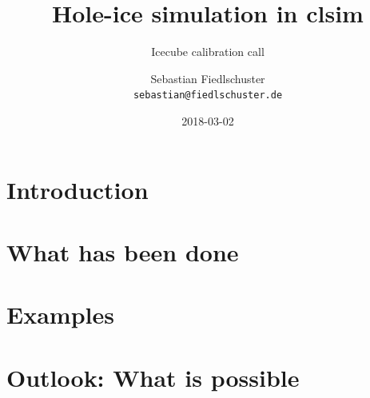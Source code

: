 \documentclass[green, 12pt]{beamer}
\title{Hole-ice simulation in clsim}
\subtitle{Icecube calibration call}
\date{2018-03-02}
\author[Sebastian Fiedlschuster \texttt{<sebastian@fiedlschuster.de>}]{Sebastian Fiedlschuster \\ \tiny\texttt{sebastian@fiedlschuster.de}}
\institute{Erlangen Centre for Astroparticle Physics}
\newif\ifplacelogo %
\begin{document}




\placelogofalse

\section{Introduction}

\section{What has been done}




\section{Examples}





\section{Outlook: What is possible}
\end{document}
